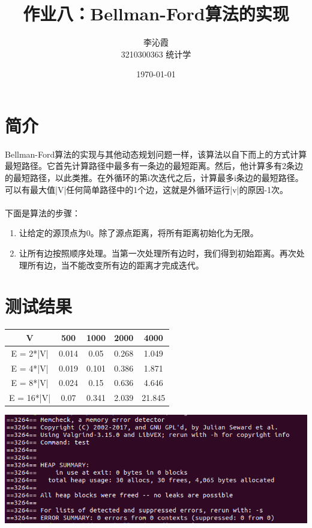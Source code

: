 \documentclass[a4paper]{article}
\title{\textbf{作业八：Bellman-Ford算法的实现}}
\author{李沁霞 \\ 3210300363 统计学}
\date{\today}
\begin{document}
\maketitle

\section{简介}
Bellman-Ford算法的实现与其他动态规划问题一样，该算法以自下而上的方式计算最短路径。它首先计算路径中最多有一条边的最短距离。然后，他计算多有2条边的最短路径，以此类推。在外循环的第i次迭代之后，计算最多i条边的最短路径。可以有最大值|V|任何简单路径中的1个边，这就是外循环运行|v|的原因-1次。\\
\\
下面是算法的步骤：
\begin{enumerate}
    \item 让给定的源顶点为0。除了源点距离，将所有距离初始化为无限。
    \item 让所有边按照顺序处理。当第一次处理所有边时，我们得到初始距离。再次处理所有边，当不能改变所有边的距离才完成迭代。
\end{enumerate}

\section{测试结果}
\begin{tabular}{|c|c|c|c|c|}
    \hline
     V &  500 & 1000 & 2000 & 4000 \\
     \hline
     E = 2*|V| & 0.014 & 0.05 & 0.268 & 1.049 \\
     E = 4*|V| & 0.019 & 0.101 & 0.386 & 1.871 \\
     E = 8*|V| & 0.024 & 0.15 & 0.636 & 4.646 \\
     E = 16*|V| & 0.07 & 0.341 & 2.039 & 21.845 \\
     \hline
\end{tabular}
\begin{center}
    \includegraphics[scale= 0.5]{leaks}
\end{center}
\end{document}
